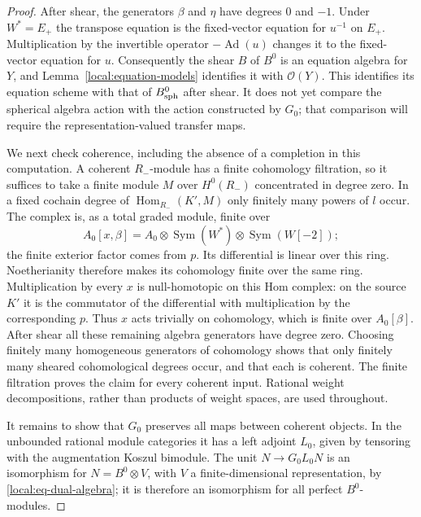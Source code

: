 \documentclass[11pt]{article}
\numberwithin{equation}{section}
\theoremstyle{definition}
\theoremstyle{remark}
\newcommand{\cO}{\mathcal O}
\newcommand{\Ad}{\operatorname{Ad}}
\newcommand{\Hom}{\operatorname{Hom}}
\newcommand{\Sym}{\operatorname{Sym}}
\begin{document}
\begin{proof}
After shear, the generators $\beta$ and $\eta$ have degrees $0$ and
$-1$.  Under $W^*=E_+$ the transpose equation is the fixed-vector
equation for $u^{-1}$ on $E_+$.  Multiplication by the invertible
operator $-\Ad(u)$ changes it to the fixed-vector equation for $u$.
Consequently the shear $B$ of $B^0$ is an equation algebra for $Y$,
and Lemma~\ref{local:equation-models} identifies it with $\cO(Y)$.
This identifies its equation scheme with that of $B_{\rm sph}^0$
after shear.  It does not yet compare the spherical algebra action
with the action constructed by $G_0$; that comparison will require
the representation-valued transfer maps.

We next check coherence, including the absence of a completion in
this computation.  A coherent $R_-$-module has a finite cohomology
filtration, so it suffices to take a finite module $M$ over
$H^0(R_-)$ concentrated in degree zero.  In a fixed cochain degree
of $\Hom_{R_-}(K',M)$ only finitely many powers of $l$ occur.
The complex is, as a total graded module, finite over
\[
 A_0[x,\beta]
 =A_0\otimes\Sym(W^*)\otimes\Sym(W[-2]);
\]
the finite exterior factor comes from $p$.  Its differential is
linear over this ring.  Noetherianity therefore makes its cohomology
finite over the same ring.  Multiplication by every $x$ is
null-homotopic on this Hom complex: on the source $K'$ it is the
commutator of the differential with multiplication by the corresponding
$p$.  Thus $x$ acts trivially on cohomology, which is finite over
$A_0[\beta]$.  After shear all these remaining algebra generators
have degree zero.  Choosing finitely many homogeneous generators of
cohomology shows that only finitely many sheared cohomological degrees
occur, and that each is coherent.  The finite filtration proves the
claim for every coherent input.  Rational weight decompositions,
rather than products of weight spaces, are used throughout.

It remains to show that $G_0$ preserves all maps between coherent
objects.  In the unbounded rational module categories it has a left
adjoint $L_0$, given by tensoring with the augmentation Koszul
bimodule.  The unit
$N\to G_0L_0N$ is an isomorphism for $N=B^0\otimes V$, with
$V$ a finite-dimensional representation, by
\eqref{local:eq-dual-algebra}; it is therefore an isomorphism for
all perfect $B^0$-modules.


\end{proof}
\end{document}
